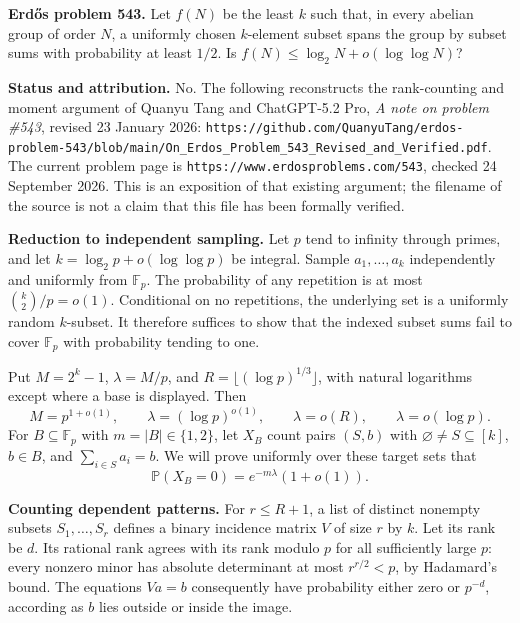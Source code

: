 \textbf{Erd\H{o}s problem 543.}
Let $f(N)$ be the least $k$ such that, in every abelian group of order $N$, a uniformly chosen $k$-element subset spans the group by subset sums with probability at least $1/2$. Is $f(N)\leq\log_2N+o(\log\log N)$?

\textbf{Status and attribution.}
No. The following reconstructs the rank-counting and moment argument of Quanyu Tang and ChatGPT-5.2 Pro, \emph{A note on problem \#543}, revised 23 January 2026:
\texttt{https://github.com/QuanyuTang/erdos-problem-543/blob/main/On\_Erdos\_Problem\_543\_Revised\_and\_Verified.pdf}.
The current problem page is \texttt{https://www.erdosproblems.com/543}, checked 24 September 2026. This is an exposition of that existing argument; the filename of the source is not a claim that this file has been formally verified.

\textbf{Reduction to independent sampling.}
Let $p$ tend to infinity through primes, and let
$k=\log_2p+o(\log\log p)$ be integral. Sample $a_1,\ldots,a_k$ independently and uniformly from $\mathbb F_p$. The probability of any repetition is at most $\binom k2/p=o(1)$. Conditional on no repetitions, the underlying set is a uniformly random $k$-subset. It therefore suffices to show that the indexed subset sums fail to cover $\mathbb F_p$ with probability tending to one.

Put $M=2^k-1$, $\lambda=M/p$, and $R=\lfloor(\log p)^{1/3}\rfloor$, with natural logarithms except where a base is displayed. Then
\[
 M=p^{1+o(1)},\qquad \lambda=(\log p)^{o(1)},\qquad
 \lambda=o(R),\qquad \lambda=o(\log p).                  \tag{1}
\]
For $B\subseteq\mathbb F_p$ with $m=|B|\in\{1,2\}$, let $X_B$ count pairs $(S,b)$ with $\varnothing\ne S\subseteq[k]$, $b\in B$, and $\sum_{i\in S}a_i=b$. We will prove uniformly over these target sets that
\[
 \mathbb P(X_B=0)=e^{-m\lambda}(1+o(1)).                 \tag{2}
\]

\textbf{Counting dependent patterns.}
For $r\leq R+1$, a list of distinct nonempty subsets $S_1,\ldots,S_r$ defines a binary incidence matrix $V$ of size $r$ by $k$. Let its rank be $d$. Its rational rank agrees with its rank modulo $p$ for all sufficiently large $p$: every nonzero minor has absolute determinant at most $r^{r/2}<p$, by Hadamard's bound.
The equations $Va=b$ consequently have probability either zero or $p^{-d}$, according as $b$ lies outside or inside the image.

